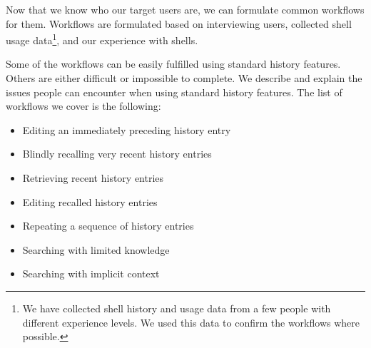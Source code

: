 Now that we know who our target users are, we can formulate common workflows for them. Workflows are formulated based on interviewing users, collected shell usage data\footnote{We have collected shell history and usage data from a few people with different experience levels. We used this data to confirm the workflows where possible.}, and our experience with shells. 

Some of the workflows can be easily fulfilled using standard history features. Others are either difficult or impossible to complete. We describe and explain the issues people can encounter when using standard history features. The list of workflows we cover is the following:








\begin{itemize}
    \item Editing an immediately preceding history entry
    \item Blindly recalling very recent history entries
    \item Retrieving recent history entries
    \item Editing recalled history entries
    \item Repeating a sequence of history entries
    \item Searching with limited knowledge
    \item Searching with implicit context
\end{itemize}

